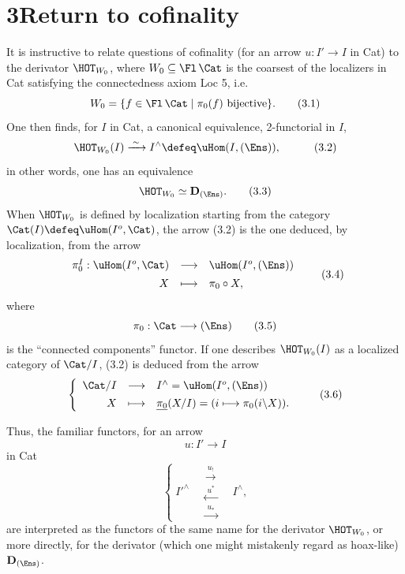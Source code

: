 
\section*{3\quad Return to cofinality}

It is instructive to relate questions of cofinality (for an arrow $u : I' \longrightarrow I$ in Cat) to the derivator $\HOT_{W_0}$, where $W_0 \subseteq \Fl\,\Cat$ is the coarsest of the localizers in Cat satisfying the connectedness axiom Loc 5, i.e.
\[
W_0 = \{ f \in \Fl\,\Cat \mid \pi_0(f) \text{ bijective}\}. \tag*{(3.1)}
\]
One then finds, for $I$ in Cat, a canonical equivalence, 2-functorial in $I$,
\[
\HOT_{W_0}(I) \xrightarrow{\;\sim\;} I^{\wedge} \defeq \uHom(I,(\Ens)), \quad \tag*{(3.2)}
\]
in other words, one has an equivalence
\[
\HOT_{W_0} \simeq \mathbf{D}_{(\Ens)}. \tag*{(3.3)}
\]
When $\HOT_{W_0}$ is defined by localization starting from the category $\Cat(I) \defeq \uHom(I^o,\Cat)$, the arrow (3.2) is the one deduced, by localization, from the arrow
\[
\begin{array}{rcl}
\pi_0^I : \uHom(I^o,\Cat) & \longrightarrow & \uHom(I^o,(\Ens)) \\[1ex]
X & \longmapsto & \pi_0 \circ X,
\end{array} \tag*{(3.4)}
\]
where
\[
\pi_0 : \Cat \longrightarrow (\Ens) \tag*{(3.5)}
\]
is the ``connected components'' functor. If one describes $\HOT_{W_0}(I)$ as a localized category of $\Cat/I$, (3.2) is deduced from the arrow
\[
\left\{
\begin{array}{rcl}
\Cat/I & \longrightarrow & I^{\wedge} = \uHom(I^o,(\Ens)) \\[1ex]
X & \longmapsto & \underline{\pi_0}(X/I) = (i \longmapsto \pi_0(i\backslash X)).
\end{array}
\right. \tag*{(3.6)}
\]

Thus, the familiar functors, for an arrow
\[
u : I' \longrightarrow I
\]
in Cat
\[
\left\{
\; I'^{\wedge} \quad
\begin{array}{c}
\xrightarrow{\;u_!\;} \\[1.5ex]
\xleftarrow{\;u^*\;} \\[1.5ex]
\xrightarrow{\;u_*\;}
\end{array}
\quad I^{\wedge},
\right. \tag*{(3.7)}
\]
are interpreted as the functors of the same name for the derivator $\HOT_{W_0}$, or more directly, for the derivator (which one might mistakenly regard as hoax-like) $\mathbf{D}_{(\Ens)}$.

